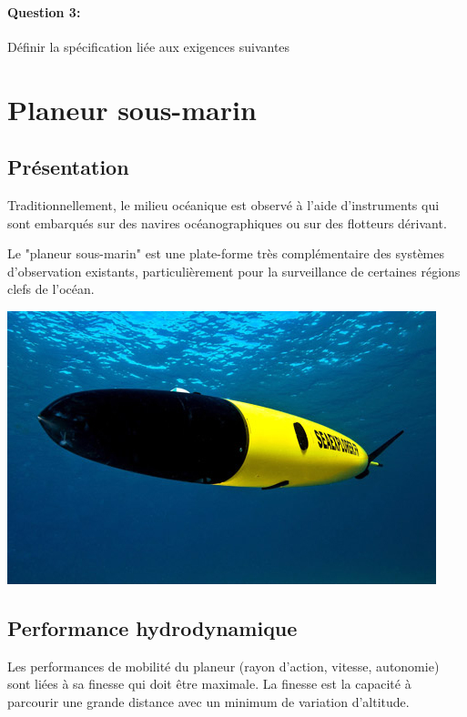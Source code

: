 \paragraph{Question 3:} Définir la spécification liée aux exigences suivantes

\newpage

\section{Planeur sous-marin}

\subsection{Présentation}

\begin{minipage}{0.55\linewidth}
Traditionnellement, le milieu océanique est observé à l'aide d'instruments qui sont embarqués sur des navires océanographiques ou sur des flotteurs dérivant.

Le "planeur sous-marin" est une plate-forme très complémentaire des systèmes d'observation existants, particulièrement pour la surveillance de certaines régions clefs de l'océan. 
\end{minipage}
\hfill
\begin{minipage}{0.4\linewidth}
 \centering\includegraphics[width=0.8\linewidth]{img/Planeur.jpg}
\end{minipage}

\subsection{Performance hydrodynamique}

Les performances de mobilité du planeur (rayon d'action, vitesse, autonomie) sont liées à sa finesse qui doit être maximale. La finesse est la capacité à parcourir une grande distance avec un minimum de variation d'altitude.

